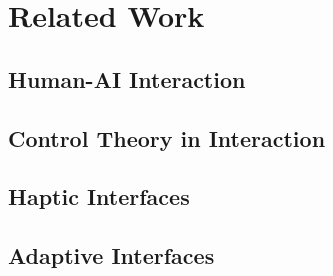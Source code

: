\documentclass[../../main.tex]{subfiles}
\begin{document}
\def\dir{chapters/related_work}

\chapter{Related Work}
\label{ch:related_work}



\section{Human-AI Interaction}


\section{Control Theory in Interaction}


\section{Haptic Interfaces}


\section{Adaptive Interfaces}

\end{document}
